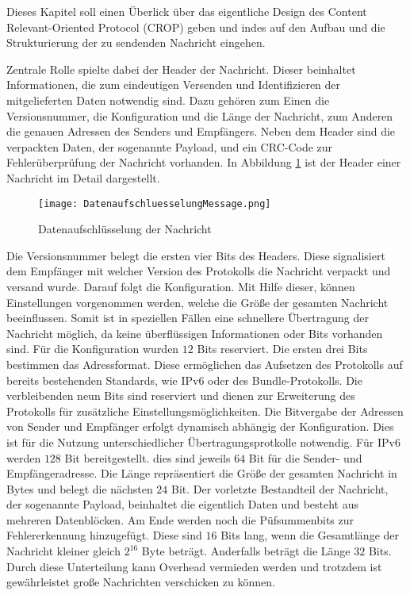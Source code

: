 \label{sec:ProtokolDesign}
Dieses Kapitel soll einen Überlick über das eigentliche Design des Content
Relevant-Oriented Protocol (CROP) geben und indes auf den Aufbau und die
Strukturierung der zu sendenden Nachricht eingehen.

Zentrale Rolle spielte dabei der Header der Nachricht. Dieser beinhaltet
Informationen, die zum eindeutigen Versenden und Identifizieren der
mitgelieferten Daten notwendig sind. Dazu gehören zum Einen die Versionsnummer,
die Konfiguration und die Länge der Nachricht, zum Anderen die genauen Adressen
des Senders und Empfängers. Neben dem Header sind die verpackten Daten, der
sogenannte Payload, und ein CRC-Code zur Fehlerüberprüfung der Nachricht
vorhanden. In Abbildung \ref{fig:DatenaufschluesselungMessage} ist der Header
einer Nachricht im Detail dargestellt.

\begin{figure}[H]
	\centering
	\texttt{[image: DatenaufschluesselungMessage.png]}
	\caption{Datenaufschlüsselung der Nachricht}
	\label{fig:DatenaufschluesselungMessage}
\end{figure}

Die Versionsnummer belegt die ersten vier Bits des Headers. Diese
signalisiert dem Empfänger mit welcher Version des Protokolls die Nachricht
verpackt und versand wurde. Darauf folgt die Konfiguration. Mit Hilfe dieser,
können Einstellungen vorgenommen werden, welche die Größe der gesamten Nachricht
beeinflussen. Somit ist in speziellen Fällen eine schnellere Übertragung der
Nachricht möglich, da keine überflüssigen Informationen oder Bits vorhanden
sind. Für die Konfiguration wurden $12$ Bits reserviert. Die ersten drei Bits
bestimmen das Adressformat. Diese ermöglichen das Aufsetzen des Protokolls auf
bereits bestehenden Standards, wie IPv6 oder des Bundle-Protokolls.
Die verbleibenden neun Bits sind reserviert und dienen zur Erweiterung des
Protokolls für zusätzliche Einstellungsmöglichkeiten. Die Bitvergabe
der Adressen von Sender und Empfänger erfolgt dynamisch abhängig der
Konfiguration.
Dies ist für die Nutzung unterschiedlicher Übertragungsprotkolle notwendig.
Für IPv6 werden $128$ Bit bereitgestellt. dies sind jeweils $64$ Bit für
die Sender- und Empfängeradresse. Die Länge repräsentiert die Größe der gesamten
Nachricht in Bytes und belegt die nächsten $24$ Bit.
Der vorletzte Bestandteil der Nachricht, der sogenannte Payload, beinhaltet die
eigentlich Daten und besteht aus mehreren Datenblöcken. Am Ende werden noch
die Püfsummenbits zur Fehlererkennung hinzugefügt. Diese sind $16$ Bits lang,
wenn die Gesamtlänge der Nachricht kleiner gleich $2^{16}$ Byte beträgt.
Anderfalls beträgt die Länge $32$ Bits. Durch diese Unterteilung kann
Overhead vermieden werden und trotzdem ist gewährleistet große Nachrichten
verschicken zu können.


